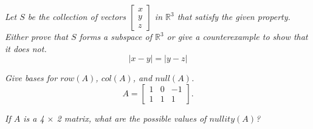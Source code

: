 \documentclass[12pt,letterpaper]{hmcpset}
\begin{document}
\section*{}


\problemlist{}


\begin{problem}[3.5.8]
    \textit{Let $S$ be the collection of vectors $\begin{bmatrix} x\\ y\\ z\end{bmatrix}$ in $\mathbb{R}^3$ that satisfy the given property. Either prove that $S$ forms a subspace of $\mathbb{R}^3$ or give a counterexample to show that it does not.}
    \[
    |x-y|=|y-z|
    \]
\end{problem}

\begin{solution}
    
\end{solution}

\newpage


\begin{problem}[3.5.17]
\textit{Give bases for $row(A)$, $col(A)$, and $null(A)$.}  
$$A = 
\begin{bmatrix}
1& 0& -1 \\
1& 1&  1
\end{bmatrix}.
$$
   
\end{problem}

\begin{solution}
	
\end{solution}

\newpage


\begin{problem}[3.5.42]
    \textit{If $A$ is a 4 $\times$ 2 matrix, what are the possible values of $nullity(A)$?}
\end{problem}

\begin{solution}
    
\end{solution}
\end{document}

